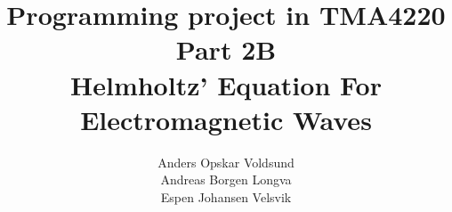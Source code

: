 \documentclass[10pt,a4paper]{article}
\begin{document}
\title{Programming project in TMA4220 \\ Part 2B \\ Helmholtz' Equation For Electromagnetic Waves}
\author{Anders Opskar Voldsund \\ Andreas Borgen Longva \\ Espen Johansen Velsvik}
\maketitle

\theoremstyle{definition}
\newtheorem{definition}{Definition}

\newtheorem{theorem}{Theorem}[section]
\newtheorem{corollary}{Corollary}[theorem]
\newtheorem{lemma}[theorem]{Lemma}
\newtheorem{algorithm}{Algorithm}

























\end{document}
